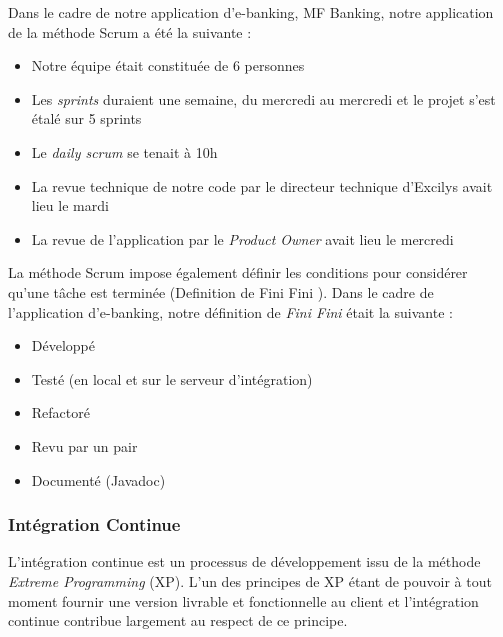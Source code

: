 Dans le cadre de notre application d'e-banking, MF Banking, notre application de la méthode Scrum a été la suivante :
\begin{itemize}
	\item Notre équipe était constituée de 6 personnes
	\item Les \textit{sprints} duraient une semaine, du mercredi au mercredi et le projet s'est étalé sur 5 sprints
	\item Le \textit{daily scrum} se tenait à 10h
	\item La revue technique de notre code par le directeur technique d'Excilys avait lieu le mardi
	\item La revue de l'application par le \textit{Product Owner} avait lieu le mercredi\\
\end{itemize}

La méthode Scrum impose également définir les conditions pour considérer qu'une tâche est terminée (Definition de \og Fini Fini \fg{}). Dans le cadre de l'application d'e-banking, notre définition de \textit{Fini Fini} était la suivante :
\begin{itemize}
	\item Développé
	\item Testé (en local et sur le serveur d'intégration)
	\item Refactoré
	\item Revu par un pair
	\item Documenté (Javadoc)
\end{itemize}

\subsubsection*{Intégration Continue}

L'intégration continue est un processus de développement issu de la méthode \textit{Extreme Programming} (XP). L'un des principes de XP étant de pouvoir à tout moment fournir une version livrable et fonctionnelle au client et l'intégration continue contribue largement au respect de ce principe.

